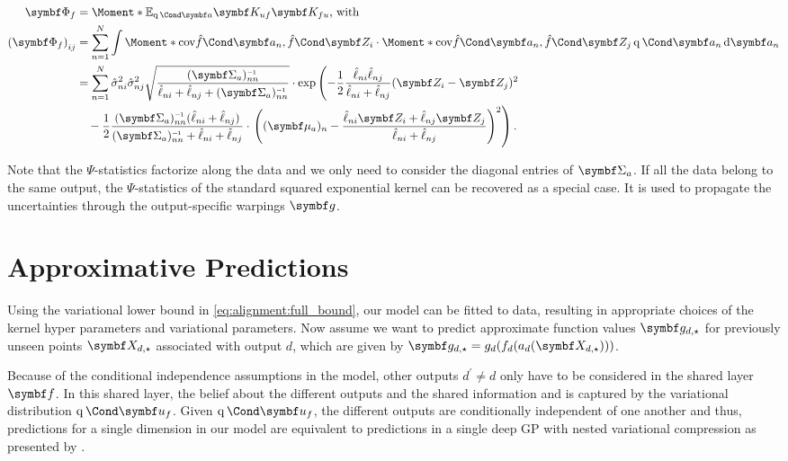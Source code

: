 \begin{align}
    \begin{split}
        \mat{\Phi_f} &= \Moment*{\E_{\Variat{\rv{a}}}}{\mat{K_{uf}}\mat{K_{fu}}}\text{, with} \\
        \left(\mat{\Phi_f} \right)_{ij} &= \sum_{n=1}^N \int \Moment*{\cov}{\Fun{\hat{f}}{\mat{a_n}}, \Fun{\hat{f}}{\mat{Z_i}}}
        \cdot \Moment*{\cov}{\Fun{\hat{f}}{\mat{a_n}}, \Fun{\hat{f}}{\mat{Z_j}}} \Variat{\rv{a_n}} \diff \rv{a_n} \\
        &= \sum_{n=1}^N \hat{\sigma}_{ni}^2 \hat{\sigma}_{nj}^2 \sqrt{\frac{(\mat{\Sigma_a})_{nn}\inv}{\hat{\ell}_{ni} + \hat{\ell}_{nj} + (\mat{\Sigma_a})_{nn}\inv}}
        \cdot \exp\left( -\frac{1}{2} \frac{\hat{\ell}_{ni}\hat{\ell}_{nj}}{\hat{\ell}_{ni} + \hat{\ell}_{nj}} (\mat{Z_i} - \mat{Z_j})^2 \right. \\
        &\quad {} - \frac{1}{2} \frac{(\mat{\Sigma_a})_{nn}\inv(\hat{\ell}_{ni} + \hat{\ell}_{nj})}{(\mat{\Sigma_a})_{nn}\inv + \hat{\ell}_{ni} + \hat{\ell}_{nj}}
        \cdot \left.\left( (\mat{\mu_a})_n - \frac{\hat{\ell}_{ni} \mat{Z_i} + \hat{\ell}_{nj} \mat{Z_j}}{\hat{\ell}_{ni} + \hat{\ell}_{nj}} \right)^2 \right).
    \end{split}
\end{align}

Note that the $\Psi$-statistics factorize along the data and we only need to consider the diagonal entries of $\mat{\Sigma_a}$.
If all the data belong to the same output, the $\Psi$-statistics of the standard squared exponential kernel can be recovered as a special case.
It is used to propagate the uncertainties through the output-specific warpings $\rv{g}$.


\section{Approximative Predictions}
\label{toc:alignment:predictions}
Using the variational lower bound in \cref{eq:alignment:full_bound}, our model can be fitted to data, resulting in appropriate choices of the kernel hyper parameters and variational parameters.
Now assume we want to predict approximate function values $\mat{g_{d, \star}}$ for previously unseen points $\mat{X_{d, \star}}$ associated with output $d$, which are given by $ \mat{g_{d, \star}} = g_d(f_d(a_d(\mat{X_{d, \star}})))$.

Because of the conditional independence assumptions in the model, other outputs $d^\prime \neq d$ only have to be considered in the shared layer $\rv{f}$.
In this shared layer, the belief about the different outputs and the shared information and is captured by the variational distribution $\Variat{\rv{u_f}}$.
Given $\Variat{\rv{u_f}}$, the different outputs are conditionally independent of one another and thus, predictions for a single dimension in our model are equivalent to predictions in a single deep GP with nested variational compression as presented by \textcite{hensman_nested_2014}.

